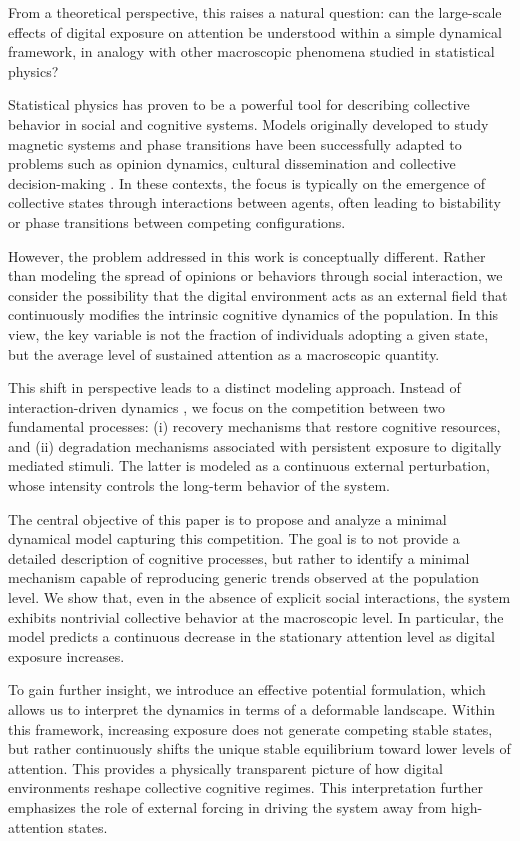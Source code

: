 \documentclass[preprint,12pt]{elsarticle}
\begin{document}
From a theoretical perspective, this raises a natural question: can the large-scale effects of digital exposure on attention be understood within a simple dynamical framework, in analogy with other macroscopic phenomena studied in statistical physics?

Statistical physics has proven to be a powerful tool for describing collective behavior in social and cognitive systems. Models originally developed to study magnetic systems and phase transitions have been successfully adapted to problems such as opinion dynamics, cultural dissemination and collective decision-making \cite{rmp,galam}. In these contexts, the focus is typically on the emergence of collective states through interactions between agents, often leading to bistability or phase transitions between competing configurations.

However, the problem addressed in this work is conceptually different. Rather than modeling the spread of opinions or behaviors through social interaction, we consider the possibility that the digital environment acts as an external field that continuously modifies the intrinsic cognitive dynamics of the population. In this view, the key variable is not the fraction of individuals adopting a given state, but the average level of sustained attention as a macroscopic quantity.

This shift in perspective leads to a distinct modeling approach. Instead of interaction-driven dynamics \cite{racism},  we focus on the competition between two fundamental processes: (i) recovery mechanisms that restore cognitive resources, and (ii) degradation mechanisms associated with persistent exposure to digitally mediated stimuli. The latter is modeled as a continuous external perturbation, whose intensity controls the long-term behavior of the system.

The central objective of this paper is to propose and analyze a minimal dynamical model capturing this competition. The goal is to not provide a detailed description of cognitive processes, but rather to identify a minimal mechanism capable of reproducing generic trends observed at the population level. We show that, even in the absence of explicit social interactions, the system exhibits nontrivial collective behavior at the macroscopic level. In particular, the model predicts a continuous decrease in the stationary attention level as digital exposure increases.

To gain further insight, we introduce an effective potential formulation, which allows us to interpret the dynamics in terms of a deformable landscape. Within this framework, increasing exposure does not generate competing stable states, but rather continuously shifts the unique stable equilibrium toward lower levels of attention. This provides a physically transparent picture of how digital environments reshape collective cognitive regimes. This interpretation further emphasizes the role of external forcing in driving the system away from high-attention states.
\end{document}
